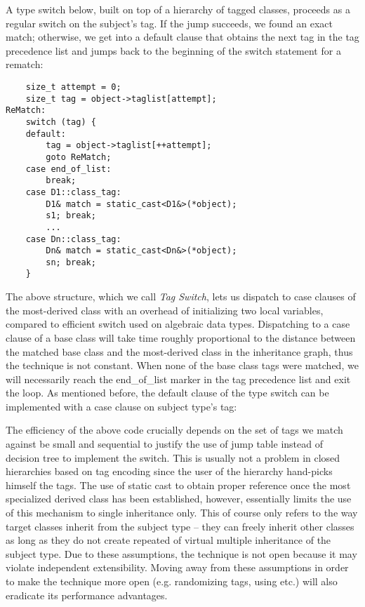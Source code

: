 A type switch below, built on top of a hierarchy of tagged classes, proceeds as 
a regular switch on the subject's tag. If the jump succeeds, we found an exact 
match; otherwise, we get into a default clause that obtains the next tag in the 
tag precedence list and jumps back to the beginning of the switch statement for a 
rematch:

\begin{lstlisting}
    size_t attempt = 0; 
    size_t tag = object->taglist[attempt];
ReMatch:
    switch (tag) {
    default:
        tag = object->taglist[++attempt];
        goto ReMatch;
    case end_of_list: 
        break;
    case D1::class_tag: 
        D1& match = static_cast<D1&>(*object); 
        s1; break;
        ...
    case Dn::class_tag: 
        Dn& match = static_cast<Dn&>(*object); 
        sn; break;
    }
\end{lstlisting}

\noindent
The above structure, which we call \emph{Tag Switch}, lets us dispatch to 
case clauses of the most-derived class with an overhead of initializing two 
local variables, compared to efficient switch used on algebraic data types. 
Dispatching to a case clause of a base class will take time roughly proportional 
to the distance between the matched base class and the most-derived class in the 
inheritance graph, thus the technique is not constant. When none of the base 
class tags were matched, we will necessarily reach the end\_of\_list marker in 
the tag precedence list and exit the loop. As mentioned before, the default 
clause of the type switch can be implemented with a case clause on subject 
type's tag: 

The efficiency of the above code crucially depends on the set of tags we match 
against be small and sequential to justify the use of jump table instead of 
decision tree to implement the switch. This is usually not a problem in closed 
hierarchies based on tag encoding since the user of the hierarchy hand-picks 
himself the tags. The use of static cast to obtain proper reference once the most 
specialized derived class has been established, however, essentially limits the use of 
this mechanism to single inheritance only. This of course only refers to the way target 
classes inherit from the subject type -- they can freely inherit other classes 
as long as they do not create repeated of virtual multiple inheritance of the 
subject type. Due to these assumptions, the technique is not open because it may 
violate independent extensibility. Moving away from these assumptions in order 
to make the technique more open (e.g. randomizing tags, using 
 etc.) will also eradicate its performance advantages.
